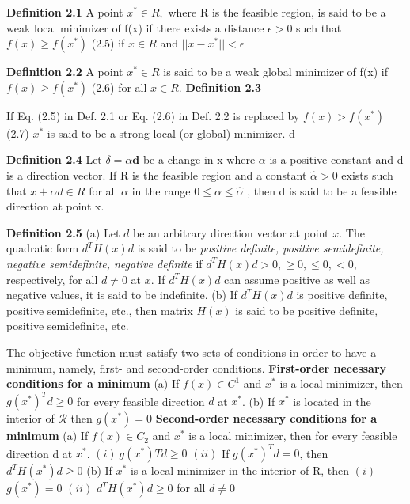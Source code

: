 \begin{multicols}{3}
\textbf{Definition 2.1} A point $x^* \in R,$ where R is the feasible region, is said to be a
weak local minimizer of f(x) if there exists a distance $\epsilon > 0$ such that
$f(x) \geq f(x^*)$ (2.5)
if
$x \in R$ and 
$||x-x^*|| < \epsilon$ \newline

\textbf{Definition 2.2} 
A point $x^* \in R $ is said to be a weak global minimizer of f(x) if
$f(x) \geq f(x^*)$ (2.6)
for all $x \in R.$  \newline
\textbf{Definition 2.3} 

If Eq. (2.5) in Def. 2.1 or Eq. (2.6) in Def. 2.2 is replaced by
$f(x) > f(x^*)$ (2.7)
$x^*$ is said to be a strong local (or global) minimizer. d

\textbf{Definition 2.4} Let $\delta = \alpha \mathbf{d}$ be a change in x where $\alpha$ is a positive constant and d is a direction vector. If R is the feasible region and a constant $\hat{\alpha} > 0$ exists such that
$x + \alpha d \in R$ for all $\alpha$ in the range $0 \leq \alpha \leq \hat{\alpha}$ , then d is said to be a feasible direction at
point x. \newline 

\textbf{Definition 2.5} \newline
(a) Let $d$ be an arbitrary direction vector at point $x$. The quadratic form
$d^TH(x)d$ is said to be \textit{positive definite, positive semidefinite, negative
	semidefinite, negative definite} if $d^TH(x)d > 0, \geq 0, \leq 0, < 0,$ respectively, for all $d \neq 0$ at $x$. If $d^TH(x)d$ can assume positive as well
as negative values, it is said to be indefinite. \newline
(b) If $d^TH(x)d$ is positive definite, positive semidefinite, etc., then matrix
$H(x)$ is said to be positive definite, positive semidefinite, etc. \newline

The objective function must satisfy two sets of conditions in order to have
a minimum, namely, first- and second-order conditions.  \newline
\textbf{First-order necessary conditions for a minimum} \newline %
(a) If $f(x) \in C^1$ and $x^*$ is a local minimizer, then
$g(x^*)^Td \geq 0$ for every feasible direction $d$ at $x^*$. \newline
(b) If $x^*$ is located in the interior of $\mathcal{R}$ then
$g(x^*) = 0$ \newline \newline 
\textbf{Second-order necessary conditions for a minimum} \newline
(a) If $f(x) \in C_2$ and $x^*$ is a local minimizer, then for every feasible direction
d at $x^*$. \hfill \break
\indent     $(i) \ g(x^*)Td \geq 0$ \newline
\indent    $(ii)$ If $g(x^*)^Td = 0$, then $d^TH(x^*)d \geq 0$ \newline
(b) If $x^*$ is a local minimizer in the interior of R, then \newline
\indent $ (i)$ $g(x^*) = 0$ \newline
\indent $ (ii)$ $d^TH(x^*)d \geq 0$ for all $d \neq 0$ 


\end{multicols}
